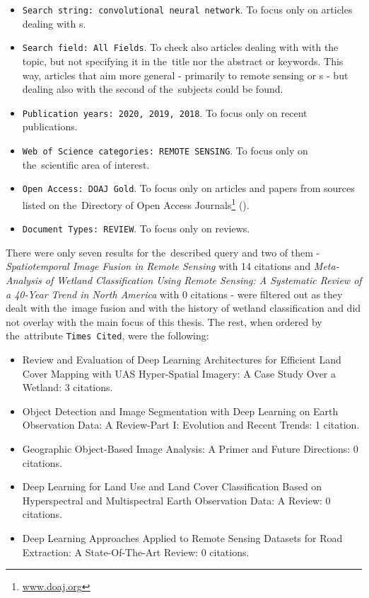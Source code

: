 \begin{itemize}
	\item \verb|Search string: convolutional neural network|. To focus only on articles dealing with s.
	\item \verb|Search field: All Fields|. To check also articles dealing with with the topic, but not specifying it in the~title nor the abstract or keywords. This way, articles that aim more general - primarily to remote sensing or s - but dealing also with the second of the~subjects could be found.
	\item \verb|Publication years: 2020, 2019, 2018|. To focus only on recent publications.
	\item \verb|Web of Science categories: REMOTE SENSING|. To focus only on the~scien\-ti\-fic area of interest.
	\item \verb|Open Access: DOAJ Gold|. To focus only on articles and papers from sources listed on the~Di\-rectory of Open Access Journals\footnote{\url{www.doaj.org}} ().
	\item \verb|Document Types: REVIEW|. To focus only on reviews.
\end{itemize}

\noindent There were only seven results for the~described query and two of them - \textit{Spatiotemporal Image Fusion in Remote Sensing} \cite{review-st-fusion} with 14 citations and \textit{Meta-Analysis of Wetland Classification Using Remote Sensing: A Systematic Review of a 40-Year Trend in North America} \cite{review-wetlands-40-years} with 0 citations - were filtered out as they dealt with the~image fusion and with the history of wetland classification and did not overlay with the main focus of this thesis. The rest, when ordered by the~attribute \verb|Times Cited|, were the following:

\begin{itemize}
	\item Review and Evaluation of Deep Learning Architectures for Efficient Land Cover Mapping with UAS Hyper-Spatial Imagery: A Case Study Over a Wetland: 3 citations. \cite{review-dl-wetlands}
	\item Object Detection and Image Segmentation with Deep Learning on Earth Observation Data: A Review-Part I: Evolution and Recent Trends: 1 citation. \cite{review-dl-eo}
	\item Geographic Object-Based Image Analysis: A Primer and Future Directions: 0 citations. \cite{geobia}
	\item Deep Learning for Land Use and Land Cover Classification Based on Hyperspectral and Multispectral Earth Observation Data: A Review: 0 citations. \cite{review-dl-lulc}
	\item Deep Learning Approaches Applied to Remote Sensing Datasets for Road Extraction: A State-Of-The-Art Review: 0 citations. \cite{review-dl-road-extraction}
\end{itemize}

